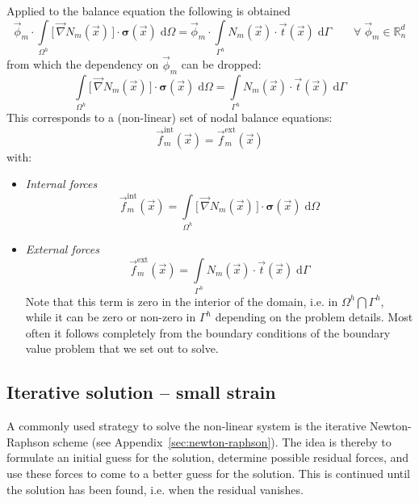 \documentclass[times,namecite]{goose-article}
\begin{document}
Applied to the balance equation the following is obtained
\begin{equation}
  \vec{\phi}_m \cdot
  \int\limits_{\Omega^h}
    \big[\, \vec{\nabla} N_m (\vec{x}) \,\big]
    \cdot
    \bm{\sigma}(\vec{x}) \;
  \mathrm{d}\Omega
  =
  \vec{\phi}_m \cdot
  \int\limits_{\Gamma^h}
    N_m (\vec{x}) \cdot
    \vec{t}(\vec{x}) \;
  \mathrm{d}\Gamma
  \qquad
  \forall \; \vec{\phi}_m \in \mathbb{R}^d_n
\end{equation}
from which the dependency on $\vec{\phi}_m$ can be dropped:
\begin{equation}
  \int\limits_{\Omega^h}
    \big[\, \vec{\nabla} N_m (\vec{x}) \,\big]
    \cdot
    \bm{\sigma}(\vec{x}) \;
  \mathrm{d}\Omega
  =
  \int\limits_{\Gamma^h}
    N_m (\vec{x}) \cdot
    \vec{t}(\vec{x}) \;
  \mathrm{d}\Gamma
\end{equation}
This corresponds to a (non-linear) set of nodal balance equations:
\begin{equation}
  \vec{f}_m^\mathrm{int}(\vec{x})
  =
  \vec{f}_m^\mathrm{ext}(\vec{x})
\end{equation}
with:
\begin{itemize}
  \item \emph{Internal forces}
  \begin{equation}
    \vec{f}_m^\mathrm{int}(\vec{x})
    =
    \int\limits_{\Omega^h}
      \big[\, \vec{\nabla} N_m (\vec{x}) \,\big]
      \cdot
      \bm{\sigma}(\vec{x}) \;
    \mathrm{d}\Omega
  \end{equation}
  \item \emph{External forces}
  \begin{equation}
    \vec{f}_m^\mathrm{ext}(\vec{x})
    =
    \int\limits_{\Gamma^h}
      N_m (\vec{x}) \cdot
      \vec{t}(\vec{x}) \;
    \mathrm{d}\Gamma
  \end{equation}
  Note that this term is zero in the interior of the domain, i.e. in $\Omega^h \bigcap \Gamma^h$, while it can be zero or non-zero in $\Gamma^h$ depending on the problem details. Most often it follows completely from the boundary conditions of the boundary value problem that we set out to solve.
\end{itemize}

\subsection{Iterative solution -- small strain}

A commonly used strategy to solve the non-linear system is the iterative Newton-Raphson scheme (see Appendix~\ref{sec:newton-raphson}). The idea is thereby to formulate an initial guess for the solution, determine possible residual forces, and use these forces to come to a better guess for the solution. This is continued until the solution has been found, i.e. when the residual vanishes.
\end{document}
